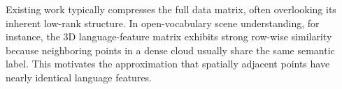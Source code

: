 \documentclass[10pt,twocolumn,letterpaper]{article}
\begin{document}
Existing work typically compresses the full data matrix, often overlooking its inherent low-rank structure. In open-vocabulary scene understanding, for instance, the 3D language-feature matrix exhibits strong row-wise similarity because neighboring points in a dense cloud usually share the same semantic label. This motivates the approximation that spatially adjacent points have nearly identical language features.

\end{document}
